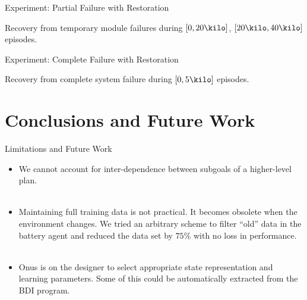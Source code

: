 \documentclass[10pt]{beamer}
\renewcommand\example[1]{{\color{black!50!green}#1}}
\begin{document}
\begin{frame}[allowframebreaks]{Experiment: Partial Failure with Restoration}
\begin{center}


Recovery from \alert{temporary module failures} during $[0,20\kilo]$, $[20\kilo,40\kilo]$ episodes.
\end{center}
\end{frame}

\begin{frame}[allowframebreaks]{Experiment: Complete Failure with Restoration}
\begin{center}


Recovery from \alert{complete system failure} during $[0,5\kilo]$ episodes.
\end{center}
\end{frame}


\section{Conclusions and Future Work}

\begin{frame}{Limitations and Future Work}
\begin{itemize}
\item<+-> We cannot account for \alert{inter-dependence between subgoals} of a higher-level plan.\\~\\
\item<+-> \alert{Maintaining full training data is not practical}. It becomes obsolete when the environment changes. \example{We tried an arbitrary scheme to filter ``old'' data in the battery agent and reduced the data set by $75\%$ with no loss in performance.}\\~\\
\item<+-> Onus is on the designer to select appropriate state representation and learning parameters. \example{Some of this could be automatically extracted from the BDI program.}
\end{itemize}
\end{frame}
\end{document}
